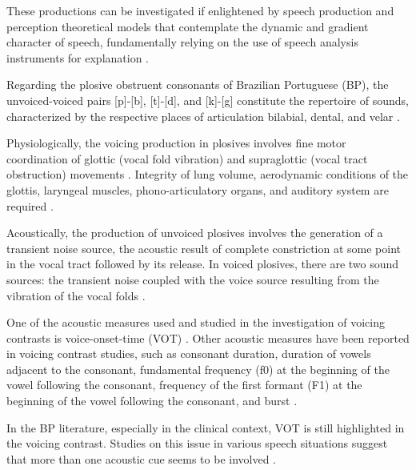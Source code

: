 These productions can be investigated if enlightened by speech production and
perception theoretical models that contemplate the dynamic and gradient
character of speech, fundamentally relying on the use of speech analysis
instruments for explanation \citep{silva2001,gregio2011,albano2007,silva2010}.

Regarding the plosive obstruent consonants of Brazilian Portuguese (BP), the
unvoiced-voiced pairs [p]-[b], [t]-[d], and [k]-[g] constitute the repertoire
of sounds, characterized by the respective places of articulation bilabial,
dental, and velar \citep{silva2001,camargo2008}.

Physiologically, the voicing production in plosives involves fine motor
coordination of glottic (vocal fold vibration) and supraglottic (vocal tract
obstruction) movements \citep{sweeting_voice_1982,shimizu1996,gregio2005}.
Integrity of lung volume, aerodynamic conditions of the glottis,
laryngeal muscles, phono-articulatory organs, and auditory system are required
\citep{hoit1993,shimizu1996,hoole1999}.

Acoustically, the production of unvoiced plosives involves the generation of a
transient noise source, the acoustic result of complete constriction at some
point in the vocal tract followed by its release. In voiced plosives, there are
two sound sources: the transient noise coupled with the voice source resulting
from the vibration of the vocal folds \citep{kent1992,johnson2003}.

One of the acoustic measures used and studied in the investigation of voicing
contrasts is voice-onset-time (VOT) \citep{lisker1964,behlau,kent1992,levy1993,shimizu1996,cho1999,camargo2000,rocca2003}.
Other acoustic measures
have been reported in voicing contrast studies, such as consonant duration,
duration of vowels adjacent to the consonant, fundamental frequency (f0) at the
beginning of the vowel following the consonant, frequency of the first formant
(F1) at the beginning of the vowel following the consonant, and burst 
\citep{barton1980,shimizu1996,veloso1997,van_alphen2004,benki2005,lousada2005,barroco_2007,whalen2007,hanson2009,tachibana2012}. %

In the BP literature, especially in the clinical context, VOT is still
highlighted in the voicing contrast. Studies on this issue in various speech
situations suggest that more than one acoustic cue seems to be involved
\citep{behlau,levy1993,barbosa1996,madureira,ficker2003,gregio2005m,gurgueira2006,barzaghi2007,bonatto2007,britto2010,gregio2011,schliemann2011,souza2010,berti2012,melo2012,pereira2012}.

